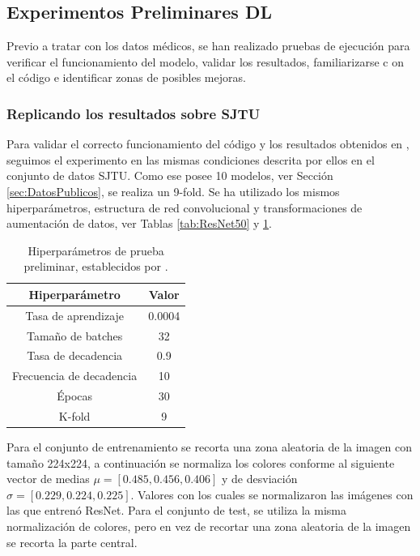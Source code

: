 \subsection{Experimentos Preliminares DL}
Previo a tratar con los datos médicos, se han realizado pruebas de ejecución 
para verificar el funcionamiento del modelo, validar los resultados, familiarizarse c
on el código e identificar zonas de posibles mejoras.

\subsubsection{Replicando los resultados sobre SJTU}
Para validar el correcto funcionamiento del código y los resultados obtenidos 
en \cite{VQA-PC}, seguimos el experimento en las mismas condiciones descrita 
por ellos en el conjunto de datos SJTU\cite{SJTU}. Como ese posee 10 modelos, 
ver Sección \ref{sec:DatosPublicos}, se realiza un 9-fold. Se ha utilizado 
los mismos hiperparámetros, estructura de red convolucional y transformaciones 
de aumentación de datos, ver Tablas 
\ref{tab:ResNet50} y \ref{tab:HiperSJTU}. 

\begin{table}[htp]
  \begin{center}
    \begin{tabular}[c]{|c|c|}
      \hline
      \rowcolor[HTML]{FFC702}
      \textbf{Hiperparámetro} & \textbf{Valor} \\ 
      \hline 
      Tasa de aprendizaje &  0.0004 \\ 
      \hline 
      Tamaño de batches & 32 \\ 
      \hline 
      Tasa de decadencia & 0.9 \\ 
      \hline 
      Frecuencia de decadencia & 10 \\ 
      \hline 
      Épocas & 30 \\ 
      \hline 
      K-fold & 9 \\ 
      \hline 
    \end{tabular}
  \end{center}
  \caption[Hiperparámetros de prueba preliminar.]{Hiperparámetros de prueba preliminar, establecidos por \cite{VQA-PC}.}
  \label{tab:HiperSJTU}
\end{table}

Para el conjunto de entrenamiento se recorta una zona aleatoria de la imagen con 
tamaño 224x224, a continuación se normaliza los colores conforme al siguiente 
vector de medias $\mu = \left[ 0.485, 0.456, 0.406 \right]$ y de desviación 
$\sigma = \left[ 0.229, 0.224, 0.225 \right]$. Valores con los cuales se 
normalizaron las imágenes con las que entrenó ResNet\cite{ResNet}.
Para el conjunto de test, se utiliza la misma normalización de colores, pero 
en vez de recortar una zona aleatoria de la imagen se recorta la parte central. 

